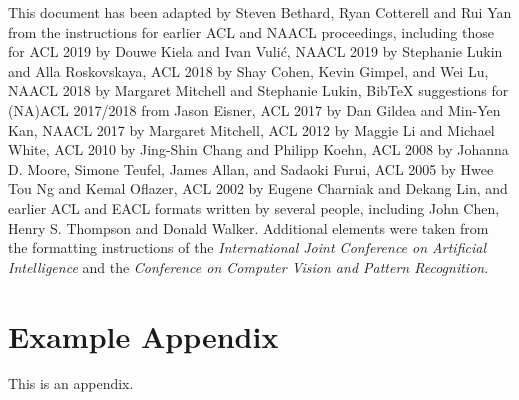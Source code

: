 \documentclass[11pt]{article}
\begin{document}
This document has been adapted
by Steven Bethard, Ryan Cotterell and Rui Yan
from the instructions for earlier ACL and NAACL proceedings, including those for
ACL 2019 by Douwe Kiela and Ivan Vuli\'{c},
NAACL 2019 by Stephanie Lukin and Alla Roskovskaya,
ACL 2018 by Shay Cohen, Kevin Gimpel, and Wei Lu,
NAACL 2018 by Margaret Mitchell and Stephanie Lukin,
Bib\TeX{} suggestions for (NA)ACL 2017/2018 from Jason Eisner,
ACL 2017 by Dan Gildea and Min-Yen Kan,
NAACL 2017 by Margaret Mitchell,
ACL 2012 by Maggie Li and Michael White,
ACL 2010 by Jing-Shin Chang and Philipp Koehn,
ACL 2008 by Johanna D. Moore, Simone Teufel, James Allan, and Sadaoki Furui,
ACL 2005 by Hwee Tou Ng and Kemal Oflazer,
ACL 2002 by Eugene Charniak and Dekang Lin,
and earlier ACL and EACL formats written by several people, including
John Chen, Henry S. Thompson and Donald Walker.
Additional elements were taken from the formatting instructions of the \emph{International Joint Conference on Artificial Intelligence} and the \emph{Conference on Computer Vision and Pattern Recognition}.



\appendix

\section{Example Appendix}
\label{sec:appendix}

This is an appendix.
\end{document}
